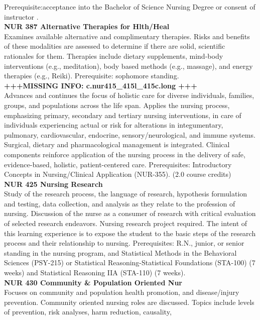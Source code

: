 \documentclass[
  letterpaper,
]{scrbook}
\begin{document}
Prerequisite:acceptance into the Bachelor of Science Nursing Degree or
consent of instructor .\\
\textbf{NUR 387 Alternative Therapies for Hlth/Heal}\\
Examines available alternative and complimentary therapies. Risks and
benefits of these modalities are assessed to determine if there are
solid, scientific rationales for them. Therapies include dietary
supplements, mind-body interventions (e.g., meditation), body based
methods (e.g., massage), and energy therapies (e.g., Reiki).
Prerequisite: sophomore standing.\\
\textbf{+++MISSING INFO: c.nur415\_415l\_415c.long +++}\\
Advances and continues the focus of holistic care for diverse
individuals, families, groups, and populations across the life span.
Applies the nursing process, emphasizing primary, secondary and tertiary
nursing interventions, in care of individuals experiencing actual or
risk for alterations in integumentary, pulmonary, cardiovascular,
endocrine, sensory/neurological, and immune systems. Surgical, dietary
and pharmacological management is integrated. Clinical components
reinforce application of the nursing process in the delivery of safe,
evidence-based, holistic, patient-centered care. Prerequisites:
Introductory Concepts in Nursing/Clinical Application (NUR-355). (2.0
course credits)\\
\textbf{NUR 425 Nursing Research}\\
Study of the research process, the language of research, hypothesis
formulation and testing, data collection, and analysis as they relate to
the profession of nursing. Discussion of the nurse as a consumer of
research with critical evaluation of selected research endeavors.
Nursing research project required. The intent of this learning
experience is to expose the student to the basic steps of the research
process and their relationship to nursing. Prerequisites: R.N., junior,
or senior standing in the nursing program, and Statistical Methods in
the Behavioral Sciences (PSY-215) or Statistical Reasoning-Statistical
Foundations (STA-100) (7 weeks) and Statistical Reasoning IIA (STA-110)
(7 weeks).\\
\textbf{NUR 430 Community \& Population Oriented Nur}\\
Focuses on community and population health promotion, and disease/injury
prevention. Community oriented nursing roles are discussed. Topics
include levels of prevention, risk analyses, harm reduction, causality,
\end{document}

